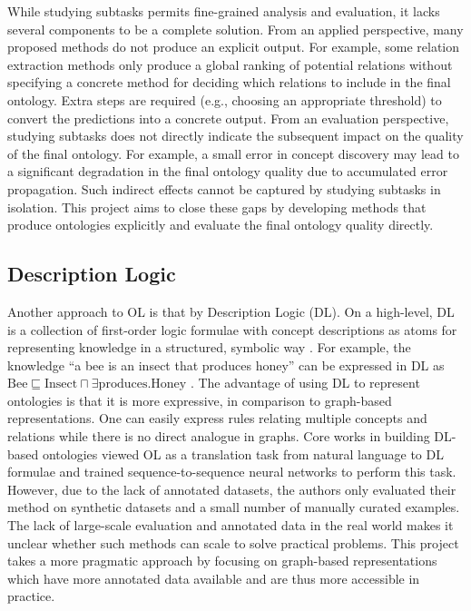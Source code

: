While studying subtasks permits fine-grained analysis and evaluation, it lacks several components to be a complete solution. From an applied perspective, many proposed methods do not produce an explicit output. For example, some relation extraction methods only produce a global ranking of potential relations \cite{roller2018hearst} without specifying a concrete method for deciding which relations to include in the final ontology. Extra steps are required (e.g., choosing an appropriate threshold) to convert the predictions into a concrete output. From an evaluation perspective, studying subtasks does not directly indicate the subsequent impact on the quality of the final ontology. For example, a small error in concept discovery may lead to a significant degradation in the final ontology quality due to accumulated error propagation. Such indirect effects cannot be captured by studying subtasks in isolation. This project aims to close these gaps by developing methods that produce ontologies explicitly and evaluate the final ontology quality directly.

\subsection{Description Logic}

Another approach to OL is that by Description Logic (DL). On a high-level, DL is a collection of first-order logic formulae with concept descriptions as atoms for representing knowledge in a structured, symbolic way \cite{baader2017introduction}. For example, the knowledge ``a bee is an insect that produces honey'' can be expressed in DL as
    {
        \sffamily
        $\text{Bee} \sqsubseteq \text{Insect} \sqcap  \exists \text{produces}. \text{Honey}$
    }.
The advantage of using DL to represent ontologies is that it is more expressive, in comparison to graph-based representations. One can easily express rules relating multiple concepts and relations while there is no direct analogue in graphs. Core works in building DL-based ontologies viewed OL as a translation task from natural language to DL formulae \citet{petrucci2016ontology,petrucci2018expressive} and trained sequence-to-sequence neural networks to perform this task. However, due to the lack of annotated datasets, the authors only evaluated their method on synthetic datasets and a small number of manually curated examples. The lack of large-scale evaluation and annotated data in the real world makes it unclear whether such methods can scale to solve practical problems. This project takes a more pragmatic approach by focusing on graph-based representations which have more annotated data available and are thus more accessible in practice.

